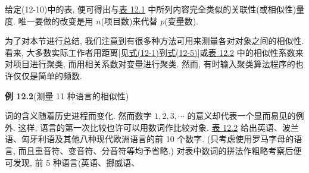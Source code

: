 给定(12-10)中的表, 便可得出与\hyperref[tab:12.1]{表 12.1} 中所列内容完全类似的关联性(或相似性)量度. 唯一要做的改变是用 $n$(项目数)来代替 $p$(变量数).


为了对本节进行总结, 我们注意到有很多种方法可用来测量各对对象之间的相似性. 看来, 大多数实际工作者用距离[见\hyperref[eq:12-1]{式(12-1)}到\hyperref[eq:12-5]{式(12-5)}]或\hyperref[tab:12.2]{表 12.2} 中的相似性系数来对项目进行聚类, 而用相关系数对变量进行聚类. 然而, 有时输入聚类算法程序的也许仅仅是简单的频数.

\noindent\textbf{例 12.2}\quad (测量 11 种语言的相似性)

词的含义随着历史进程而变化. 然而数字 $1,2,3,\cdots$ 的意义却代表一个显而易见的例外. 这样, 语言的第一次比较也许可以用数词作比较对象. \hyperref[tab:12.2]{表 12.2} 给出英语、波兰语、匈牙利语及其他八种现代欧洲语言的前 10 个数字. (只考虑使用罗马字母的语言, 而且重音符、变音符、分音符等均予省略.) 对表中数词的拼法作粗略考察后便可发现, 前 5 种语言(英语、挪威语、
